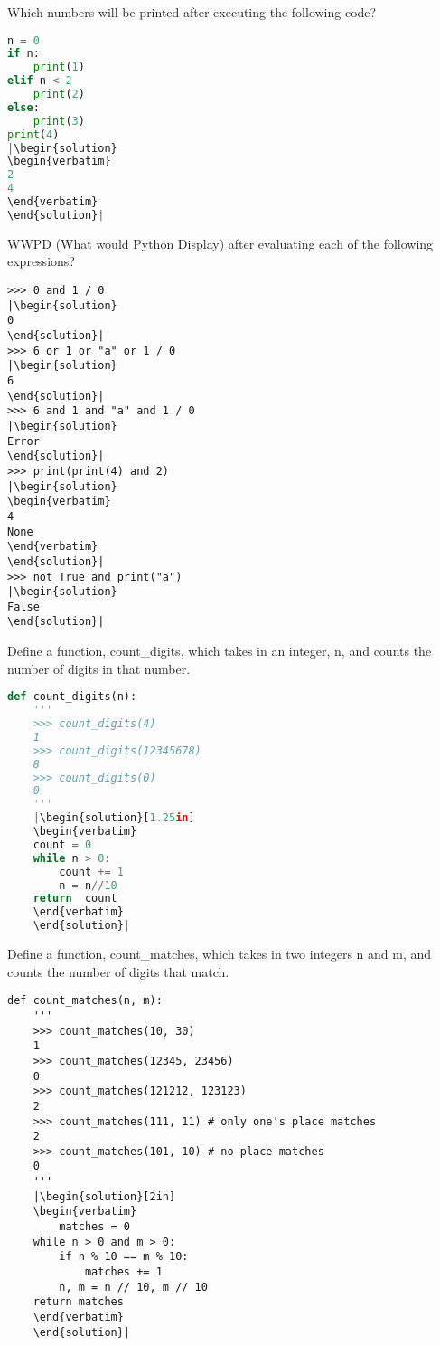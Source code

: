 \question
Which numbers will be printed after executing the following code?
\begin{lstlisting}[language=Python]
n = 0
if n:
    print(1)
elif n < 2
    print(2)
else:
    print(3)
print(4)
|\begin{solution}
\begin{verbatim}
2
4
\end{verbatim}
\end{solution}|
\end{lstlisting}

\question
WWPD (What would Python Display) after evaluating each of the following expressions?
\begin{lstlisting}
>>> 0 and 1 / 0
|\begin{solution}
0
\end{solution}|
>>> 6 or 1 or "a" or 1 / 0
|\begin{solution}
6
\end{solution}|
>>> 6 and 1 and "a" and 1 / 0
|\begin{solution}
Error
\end{solution}|
>>> print(print(4) and 2)
|\begin{solution}
\begin{verbatim}
4
None
\end{verbatim}
\end{solution}|
>>> not True and print("a")
|\begin{solution}
False
\end{solution}|
\end{lstlisting}
\question
Define a function, count\_digits, which takes in an integer, n, and counts the number of digits in that number.
\begin{lstlisting}[language=Python]
def count_digits(n):
    '''
    >>> count_digits(4)
    1
    >>> count_digits(12345678)
    8
    >>> count_digits(0)
    0
    '''
    |\begin{solution}[1.25in]
    \begin{verbatim}
    count = 0
    while n > 0:
        count += 1
        n = n//10
    return  count
    \end{verbatim}
    \end{solution}|
\end{lstlisting}

\question
Define a function, count\_matches, which takes in two integers n and m, and counts the number of digits that match.
\begin{lstlisting}
def count_matches(n, m):
    '''
    >>> count_matches(10, 30)
    1
    >>> count_matches(12345, 23456)
    0
    >>> count_matches(121212, 123123)
    2
    >>> count_matches(111, 11) # only one's place matches
    2
    >>> count_matches(101, 10) # no place matches
    0
    '''
	|\begin{solution}[2in]
	\begin{verbatim}
	    matches = 0
    while n > 0 and m > 0:
        if n % 10 == m % 10:
            matches += 1	    
        n, m = n // 10, m // 10
    return matches
	\end{verbatim}
	\end{solution}|
\end{lstlisting}


